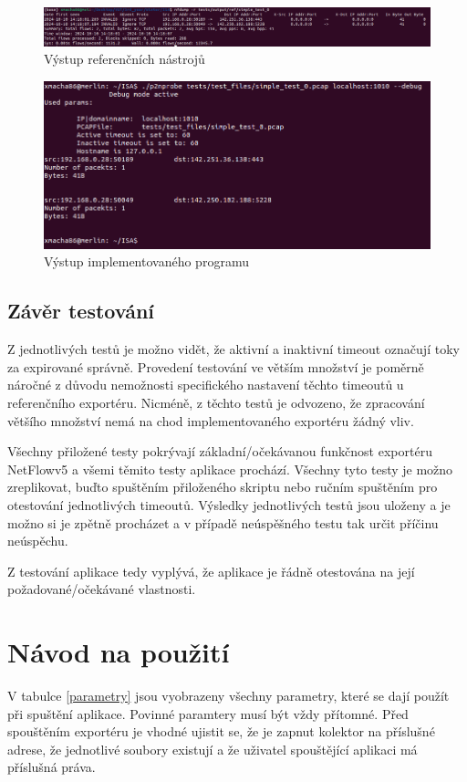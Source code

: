\documentclass[11pt, a4paper, hidelinks]{article}[08.10.2023]
\begin{document}
    \begin{figure}[H]
        \centering
        \includegraphics[width=0.9\linewidth]{pictures/ref_out.png}
        \caption{Výstup referenčních nástrojů}
        \label{ref_test}
    \end{figure}

        \begin{figure}[H]
        \centering
        \includegraphics[width=0.9\linewidth]{pictures/impl_out.png}
        \caption{Výstup implementovaného programu}
        \label{impl_test}
    \end{figure}

    
    \subsection{Závěr testování}
    Z jednotlivých testů je možno vidět, že aktivní a inaktivní timeout označují toky za expirované správně. Provedení testování ve větším množství je poměrně náročné z důvodu nemožnosti specifického nastavení těchto timeoutů u referenčního exportéru. Nicméně, z těchto testů je odvozeno, že zpracování většího množství nemá na chod implementovaného exportéru žádný vliv.

    Všechny přiložené testy pokrývají základní/očekávanou funkčnost exportéru NetFlowv5 a všemi těmito testy aplikace prochází. Všechny tyto testy je možno zreplikovat, buďto spuštěním přiloženého skriptu nebo ručním spuštěním pro otestování jednotlivých timeoutů. Výsledky jednotlivých testů jsou uloženy a je možno si je zpětně procházet a v případě neúspěšného testu tak určit příčinu neúspěchu.

    Z testování aplikace tedy vyplývá, že aplikace je řádně otestována na její požadované/očekávané vlastnosti.
    
    \section{Návod na použití}
    V tabulce \ref{parametry} jsou vyobrazeny všechny parametry, které se dají použít při spuštění aplikace. Povinné paramtery musí být vždy přítomné. Před spouštěním exportéru je vhodné ujistit se, že je zapnut kolektor na příslušné adrese, že jednotlivé soubory existují a že uživatel spouštějící aplikaci má příslušná práva. 
    
\end{document}
